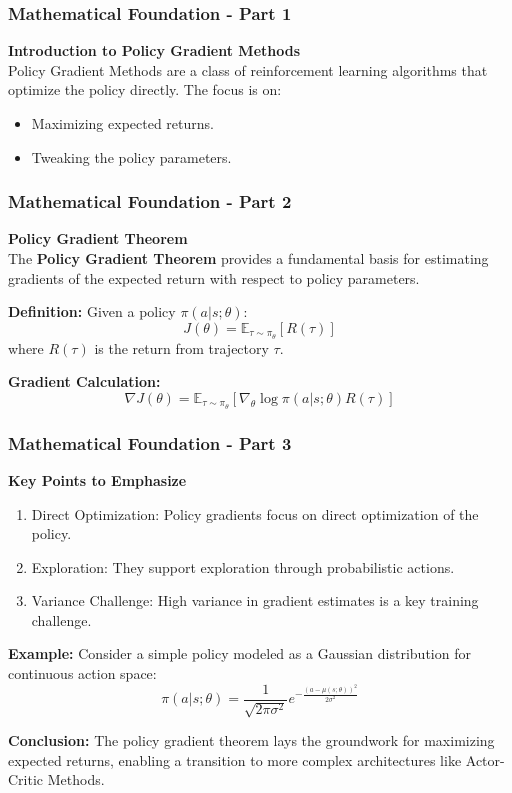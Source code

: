 \documentclass{beamer}
\begin{document}
\begin{frame}[fragile]
    \frametitle{Mathematical Foundation - Part 1}
    \textbf{Introduction to Policy Gradient Methods} \\
    Policy Gradient Methods are a class of reinforcement learning algorithms that optimize the policy directly. The focus is on:
    \begin{itemize}
        \item Maximizing expected returns.
        \item Tweaking the policy parameters.
    \end{itemize}
\end{frame}

\begin{frame}[fragile]
    \frametitle{Mathematical Foundation - Part 2}
    \textbf{Policy Gradient Theorem} \\
    The \textbf{Policy Gradient Theorem} provides a fundamental basis for estimating gradients of the expected return with respect to policy parameters.

    \textbf{Definition:}
    Given a policy \( \pi(a|s; \theta) \):
    \[
    J(\theta) = \mathbb{E}_{\tau \sim \pi_\theta}[R(\tau)]
    \]
    where \( R(\tau) \) is the return from trajectory \( \tau \).

    \textbf{Gradient Calculation:}
    \[
    \nabla J(\theta) = \mathbb{E}_{\tau \sim \pi_\theta}\left[ \nabla_\theta \log \pi(a|s; \theta) R(\tau) \right]
    \]
\end{frame}

\begin{frame}[fragile]
    \frametitle{Mathematical Foundation - Part 3}
    \textbf{Key Points to Emphasize}
    \begin{enumerate}
        \item Direct Optimization: Policy gradients focus on direct optimization of the policy.
        \item Exploration: They support exploration through probabilistic actions.
        \item Variance Challenge: High variance in gradient estimates is a key training challenge.
    \end{enumerate}

    \textbf{Example:}
    Consider a simple policy modeled as a Gaussian distribution for continuous action space:
    \[
    \pi(a|s; \theta) = \frac{1}{\sqrt{2\pi\sigma^2}} e^{-\frac{(a - \mu(s; \theta))^2}{2\sigma^2}}
    \]
    
    \textbf{Conclusion:}
    The policy gradient theorem lays the groundwork for maximizing expected returns, enabling a transition to more complex architectures like Actor-Critic Methods.
\end{frame}
\end{document}
